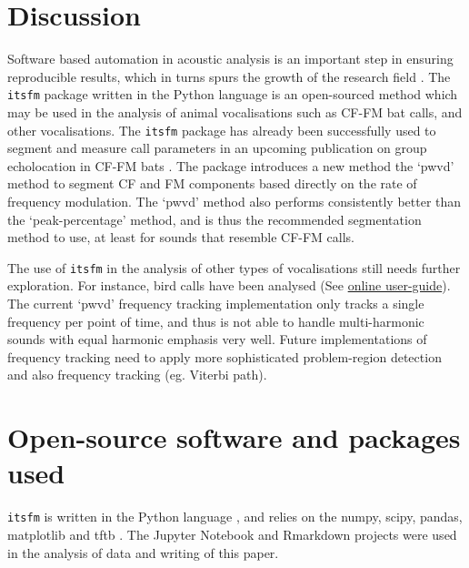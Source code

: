 \documentclass[
]{book}
\begin{document}
\hypertarget{discussion-2}{%
\section{Discussion}\label{discussion-2}}

Software based automation in acoustic analysis is an important step in ensuring reproducible results, which in turns spurs the growth of the research field \citep{mcfee2018open, bakervincent2019}. The \texttt{itsfm} package written in the Python \citep{van1995python} language is an open-sourced method which may be used in the analysis of animal vocalisations such as CF-FM bat calls, and other vocalisations. The \texttt{itsfm} package has already been successfully used to segment and measure call parameters in an upcoming publication on group echolocation in CF-FM bats \citep{hbcpaper}. The package introduces a new method the `pwvd' method to segment CF and FM components based directly on the rate of frequency modulation. The `pwvd' method also performs consistently better than the `peak-percentage' method, and is thus the recommended segmentation method to use, at least for sounds that resemble CF-FM calls.

The use of \texttt{itsfm} in the analysis of other types of vocalisations still needs further exploration. For instance, bird calls have been analysed (See \href{https://itsfm.readthedocs.io/en/latest/gallery_dir/z_bird_eg.html\#sphx-glr-gallery-dir-z-bird-eg-py}{online user-guide}). The current `pwvd' frequency tracking implementation only tracks a single frequency per point of time, and thus is not able to handle multi-harmonic sounds with equal harmonic emphasis very well. Future implementations of frequency tracking need to apply more sophisticated problem-region detection and also frequency tracking (eg. Viterbi path).

\hypertarget{open-source-software-and-packages-used}{%
\section{Open-source software and packages used}\label{open-source-software-and-packages-used}}

\texttt{itsfm} is written in the Python language \citep{van1995python}, and relies on the numpy, scipy, pandas, matplotlib and tftb \citep{numpy, 2020SciPy, matplotlib, pandas, tftb}. The Jupyter Notebook and Rmarkdown projects \citep{jupyter, rmarkdown} were used in the analysis of data and writing of this paper.
\end{document}
